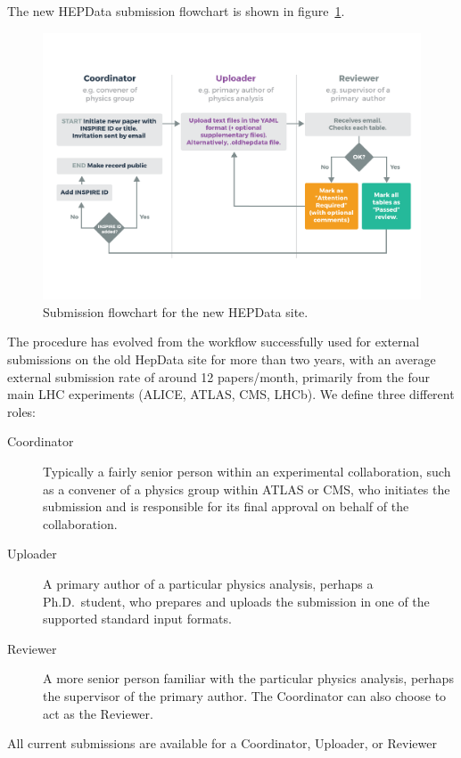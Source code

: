 \documentclass[a4paper]{jpconf}
\begin{document}
The new HEPData submission flowchart is shown in figure~\ref{fig:submission}.
%
\begin{figure}
  \begin{center}
    \includegraphics[width=\textwidth, trim=0 100 0 0]{Figures/submission_flow_updated.pdf}
  \end{center}
  \caption{\label{fig:submission}Submission flowchart for the new HEPData site.}
\end{figure}
%
The procedure has evolved from the workflow successfully used for external
submissions on the old HepData site for more than two years, with an average
external submission rate of around 12 papers/month, primarily from the four
main LHC experiments (ALICE, ATLAS, CMS, LHCb).  We define three different
roles:
%
\begin{description}
\item [Coordinator] Typically a fairly senior person within an experimental
collaboration, such as a convener of a physics group within ATLAS or CMS, who
initiates the submission and is responsible for its final approval on behalf of
the collaboration.
\item [Uploader] A primary author of a particular physics analysis, perhaps a
Ph.D.~student, who prepares and uploads the submission in one of the supported
standard input formats.
\item [Reviewer] A more senior person familiar with the particular physics
analysis, perhaps the supervisor of the primary author.  The Coordinator can
also choose to act as the Reviewer.
\end{description}
%
All current submissions are available for a Coordinator, Uploader, or Reviewer
\end{document}
